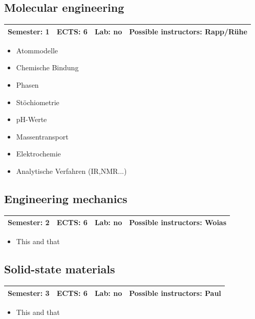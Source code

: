\documentclass[12pt,twoside,fleqn,a4paper]{article}
\begin{document}
\subsection{Molecular engineering}
\begin{tabular}{llll} \hline
\textbf{Semester:} 1 & \textbf{ECTS:} 6 & \textbf{Lab:} no & \textbf{Possible instructors:} Rapp/Rühe\\
\hline
\end{tabular}

\begin{itemize}
\setlength\itemsep{0cm}
\item Atommodelle
\item Chemische Bindung
\item Phasen
\item Stöchiometrie
\item pH-Werte
\item Massentransport
\item Elektrochemie
\item Analytische Verfahren (IR,NMR...)
\end{itemize}


\subsection{Engineering mechanics}
\begin{tabular}{llll} \hline
\textbf{Semester:} 2 & \textbf{ECTS:} 6 & \textbf{Lab:} no & \textbf{Possible instructors:} Woias\\
\hline
\end{tabular}

\begin{itemize}
\setlength\itemsep{0cm}
\item This and that
\end{itemize}


\subsection{Solid-state materials}
\begin{tabular}{llll} \hline
\textbf{Semester:} 3 & \textbf{ECTS:} 6 & \textbf{Lab:} no & \textbf{Possible instructors:} Paul\\
\hline
\end{tabular}

\begin{itemize}
\setlength\itemsep{0cm}
\item This and that
\end{itemize}
\end{document}
